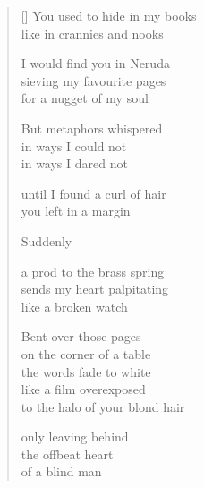 \documentclass[12pt,a4paper]{article}
\begin{document}
\bigskip

\begin{verse}[\versewidth]
  You used to hide in my books \\
  like in crannies and nooks

  I would find you in Neruda \\
  sieving my favourite pages \\
  for a nugget of my soul

  But metaphors whispered \\
  in ways I could not \\
  in ways I dared not

  until I found a curl of hair \\
  you left in a margin

  Suddenly

  a prod to the brass spring \\
  sends my heart palpitating \\
  like a broken watch

  Bent over those pages \\
  on the corner of a table \\
  the words fade to white \\
  like a film overexposed \\
  to the halo of your blond hair

  only leaving behind \\
  the offbeat heart \\
  of a blind man
\end{verse}


\newpage

\poemtitle{}

\settowidth{\versewidth}{on your body of soft amber}

\bigskip
\end{document}
